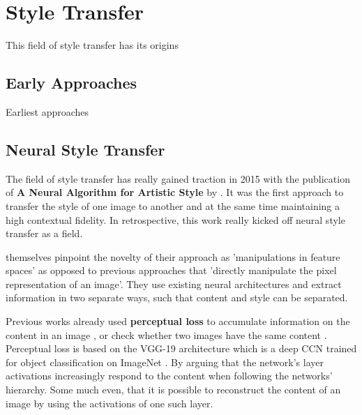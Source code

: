 \section{Style Transfer}

This field of style transfer has its origins 

\subsection{Early Approaches}
Earliest approaches




\subsection{Neural Style Transfer}
The field of style transfer has really gained traction in 2015 with the publication of \textbf{A Neural Algorithm for Artistic Style} by \citeauthor*{gatys}.
It was the first approach to transfer the style of one image to another and at the same time maintaining a high contextual fidelity.
In retrospective, this work really kicked off neural style transfer as a field.

\citeauthor*{gatys} themselves pinpoint the novelty of their approach as 'manipulations in feature spaces' as opposed to previous approaches that 'directly manipulate the pixel representation of an image'\cite{gatys}.
They use existing neural architectures and extract information in two separate ways, such that content and style can be separated.

Previous works already used \textbf{perceptual loss} to accumulate information on the content in an image \cite{percep_loss}, or check whether two images have the same content \cite{other_percep_loss}.
Perceptual loss is based on the VGG-19 architecture \cite{VGG} which is a deep CCN trained for object classification on ImageNet \cite{imagenet}.
By arguing that the network's layer activations increasingly respond to the content when following the networks' hierarchy.
Some much even, that it is possible to reconstruct the content of an image by using the activations of one such layer.

